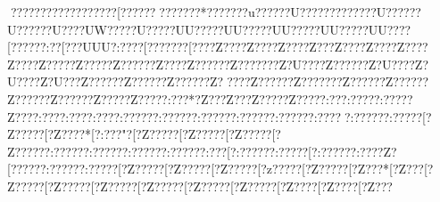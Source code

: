 {{{{{{{{{{{{{{{{{{{{{{{{{{{{{{{{{{{{{{{{{{{{{{{{{{{{{{{{{{{{{{{{{{{{{{{{{{{{{{{{{{{{{{{{{{{{{{{{{{{{{{{{{{{{{{{{{{{{{{{{{{{{{{{{{{{{{{{{{{{{{{{{{{{{{{{{{{{{{{{{{{{{{{{{{{{{{{{{{{{{{{{{{{{{{{{{{{{{{{{{{{{{{{{{{{{{{{{{{{{{{{{{{{{{{{{{{{{{{{{{{{{{{{{{{{{{{{{{{{{{{{{{{{{{{{{{{{{{{{{{{{{{{{{{{{{{{{{{{{{{{{{{{{{{{{{{{{{{{{{{{{{{{{{{{{{{{{{{{{{{{{{{{{{{{{{{{{{{{{{{{{{{{{{{{{{{{{{{{{{{{{{{{{{{{{{{{{{{{{{{{{{{{{{{{{{{{{{{{{{{{{{{{{{{{{{{{{{{{{{{{{{{{{{{{{{{{{{{{{{{{{{{{{{{{{{{{{{{{{{{{{{{{{{{{{{{{{{{{{{{{{{{{{{{{{{{{{{{{{{{{{{{{{{{{{{{{{{{{{{{{{{{{{{{{{{{{{{{{{{{{{{{{{{{{{{{{{{{{{{{{{{{{{{{{{{{{{{{{{{{{{{{{{{{{{{{{{{{{{{{{{{{{{{{{{{{{{{{{{{{{{{{{{{{{{{{{{{{{{{{{{{{{{{{{{{{{{{{{{{{{{{{{{{{{{{{{{{{{{{{{{{{{{{{{{{{{{{{{{{{{{{{{{{{{{{{{{{{{{{{{{{{{{{{{{{{{{{{{{{{{{{{{{{{{{{{{{{{{{{{{{{{{{{{{{{{{{{{{{{{{{{{{{{{{{{{{{{{{{{{{{{{{{{{{{{{{{{{{{{{{{{{{{{{{{{{{{{{{{{{{{{{{{{{{{{{{{{{{{{{{{{{{{{{{{{{{{{{{{{{{{{{{{{{{{{{{{{ ??{??   ??{??   ??{??   ??{??   ??[??   ??{??? ??{????*??{?? ??{?u?????{?U?????{???????{?U?????{?U?????{?U???{?UW????{?U}????{?UU????{?UU????{?UU????{?UU????{?UU????[?????{?:??   [?{??UUU{?:??   ??[???????[???{?Z???  {?Z???  {?Z???  {?Z??   {?Z???  {?Z???  {?Z???  {?Z???  {?Z???? {?Z???? {?Z?????{?Z???{?Z?????{?Z???????Z?U???{?Z?????{?Z?U???{?Z?U???{?Z?U???Z?{? ???{?Z?????{?Z?????{?Z????{?Z?????{?Z???????Z?????{?Z?????{?Z?????{?Z?????{?Z???? {?Z???? {?:???* {?Z??  {?Z?? {?Z???? {?Z???? {?:??   {?:???? {?:???? {?Z???  {?:???  {?:???  {?:???  {?:?????{?:?????{?:?????{?:?????{?:?????{?:????{?:?????{?:?????[?Z?????[?Z????*[?:???"?[?Z?????[?Z?????[?Z?????[?Z?????{?:?????{?:?????{?:?????{?:?????{?:???[?:?????{?:?????[?:?????{?:????Z?[?????{?:?????{?:?????[?Z?????[?Z?????[?Z?????[?z?????[?Z?????[?Z???* [?Z???[?Z?????[?Z?????[?Z?????[?Z?????[?Z?????[?Z?????[?Z???? [?Z???? [?Z???
}}}}}}}}}}}}}}}}}}}}}}}}}}}}}}}}}}}}}}}}}}}}}}}}}}}}}}}}}}}}}}}}}}}}}}}}}}}}}}}}}}}}}}}}}}}}}}}}}}}}}}}}}}}}}}}}}}}}}}}}}}}}}}}}}}}}}}}}}}}}}}}}}}}}}}}}}}}}}}}}}}}}}}}}}}}}}}}}}}}}}}}}}}}}}}}}}}}}}}}}}}}}}}}}}}}}}}}}}}}}}}}}}}}}}}}}}}}}}}}}}}}}}}}}}}}}}}}}}}}}}}}}}}}}}}}}}}}}}}}}}}}}}}}}}}}}}}}}}}}}}}}}}}}}}}}}}}}}}}}}}}}}}}}}}}}}}}}}}}}}}}}}}}}}}}}}}}}}}}}}}}}}}}}}}}}}}}}}}}}}}}}}}}}}}}}}}}}}}}}}}}}}}}}}}}}}}}}}}}}}}}}}}}}}}}}}}}}}}}}}}}}}}}}}}}}}}}}}}}}}}}}}}}}}}}}}}}}}}}}}}}}}}}}}}}}}}}}}}}}}}}}}}}}}}}}}}}}}}}}}}}}}}}}}}}}}}}}}}}}}}}}}}}}}}}}}}}}}}}}}}}}}}}}}}}}}}}}}}}}}}}}}}}}}}}}}}}}}}}}}}}}}}}}}}}}}}}}}}}}}}}}}}}}}}}}}}}}}}}}}}}}}}}}}}}}}}}}}}}}}}}}}}}}}}}}}}}}}}}}}}}}}}}}}}}}}}}}}}}}}}}}}}}}}}}}}}}}}}}}}}}}}}}}}}}}}}}}}}}}}}}}}}}}}}}}}}}}}}}}}}}}}}}}}}}}}}}}}}}}}}}}}}}}}}}}}}}}}}}}}}}}}}}}}}}}}}}}}}}}}}}}}}}}}}}}}}}}}}}}}}}}}}}}}}}}}}}}}}}}}}}}}}}}}}}}}}}}}}}}}}}}}}}}}}}}}}}}}}}}}}}}}}}}}}}}}}}}}}}}}}}}}}}}}}}}}}}}}}}}}}}}}}}}}}}}}}}}}}}}}}}}}}}}}}}}}}}}}}}}}}}}}}}}}}}}}}}}
